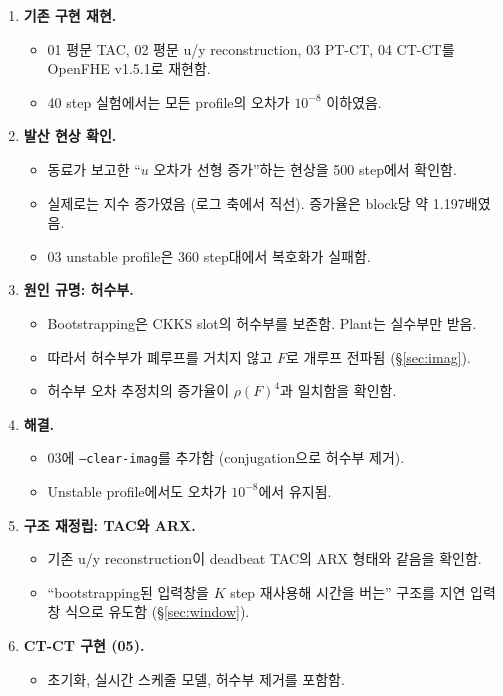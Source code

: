\documentclass[11pt,a4paper]{article}
\begin{document}
\begin{enumerate}
\item \textbf{기존 구현 재현.}
  \begin{itemize}
  \item 01 평문 TAC, 02 평문 u/y reconstruction, 03 PT-CT, 04 CT-CT를 OpenFHE v1.5.1로 재현함.
  \item 40 step 실험에서는 모든 profile의 오차가 $10^{-8}$ 이하였음.
  \end{itemize}
\item \textbf{발산 현상 확인.}
  \begin{itemize}
  \item 동료가 보고한 ``$u$ 오차가 선형 증가''하는 현상을 500 step에서 확인함.
  \item 실제로는 지수 증가였음 (로그 축에서 직선). 증가율은 block당 약 1.197배였음.
  \item 03 unstable profile은 360 step대에서 복호화가 실패함.
  \end{itemize}
\item \textbf{원인 규명: 허수부.}
  \begin{itemize}
  \item Bootstrapping은 CKKS slot의 허수부를 보존함. Plant는 실수부만 받음.
  \item 따라서 허수부가 폐루프를 거치지 않고 $F$로 개루프 전파됨 (\S\ref{sec:imag}).
  \item 허수부 오차 추정치의 증가율이 $\rho(F)^4$과 일치함을 확인함.
  \end{itemize}
\item \textbf{해결.}
  \begin{itemize}
  \item 03에 \texttt{--clear-imag}를 추가함 (conjugation으로 허수부 제거).
  \item Unstable profile에서도 오차가 $10^{-8}$에서 유지됨.
  \end{itemize}
\item \textbf{구조 재정립: TAC와 ARX.}
  \begin{itemize}
  \item 기존 u/y reconstruction이 deadbeat TAC의 ARX 형태와 같음을 확인함.
  \item ``bootstrapping된 입력창을 $K$ step 재사용해 시간을 버는'' 구조를 지연 입력창 식으로 유도함 (\S\ref{sec:window}).
  \end{itemize}
\item \textbf{CT-CT 구현 (05).}
  \begin{itemize}
  \item 초기화, 실시간 스케줄 모델, 허수부 제거를 포함함.

\end{itemize}
\end{enumerate}
\end{document}
